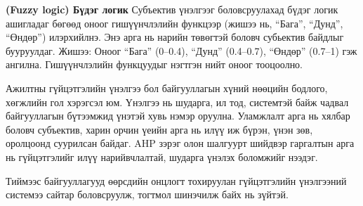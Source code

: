 \textbf{(Fuzzy logic) Бүдэг логик}
Субъектив үнэлгээг боловсруулахад бүдэг логик ашигладаг бөгөөд оноог гишүүнчлэлийн функцээр 
(жишээ нь, “Бага”, “Дунд”, “Өндөр”) илэрхийлнэ. Энэ арга нь нарийн төвөгтэй боловч субьектив
 байдлыг бууруулдаг.
Жишээ: Оноог “Бага” (0--0.4), “Дунд” (0.4--0.7),
 “Өндөр” (0.7--1) гэж ангилна. Гишүүнчлэлийн функцуудыг нэгтгэн нийт оноог тооцоолно.

Ажилтны гүйцэтгэлийн үнэлгээ бол байгууллагын хүний нөөцийн бодлого, хөгжлийн гол хэрэгсэл юм.
Үнэлгээ нь шударга, ил тод, системтэй байж чадвал байгууллагын бүтээмжид үнэтэй хувь нэмэр оруулна. 
Уламжлалт арга нь хялбар боловч субъектив, харин орчин үеийн арга нь илүү иж бүрэн, үнэн зөв, 
оролцоонд суурилсан байдаг. AHP зэрэг олон шалгуурт шийдвэр гаргалтын арга нь гүйцэтгэлийг 
илүү нарийвчлалтай, шударга үнэлэх боломжийг нээдэг.

Тиймээс байгууллагууд өөрсдийн онцлогт тохируулан гүйцэтгэлийн үнэлгээний системээ сайтар боловсруулж,
тогтмол шинэчилж байх нь зүйтэй.